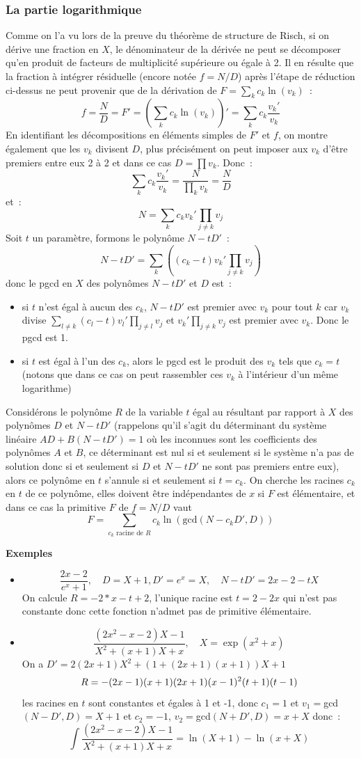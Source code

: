 \documentclass[a4paper,11pt]{article}
\begin{document}
\subsubsection{La partie logarithmique}
Comme on l'a vu lors de la preuve du théorème de structure de Risch,
si on dérive une fraction en $X$, le dénominateur de la dérivée ne
peut se décomposer qu'en produit de facteurs de multiplicité supérieure
ou égale à 2. Il en résulte que la fraction à intégrer résiduelle (encore
notée $f=N/D$) après l'étape de réduction ci-dessus ne peut provenir que de la
dérivation de $F=\sum_k c_k \ln (v_k)$~:
\[ f=\frac{N}{D}=F'= (\sum_k c_k \ln (v_k))'= \sum_k c_k \frac{v_k'}{v_k}\]
En identifiant les décompositions
en éléments simples de $F'$ et $f$, on montre également que 
les $v_k$ divisent $D$, plus précisément on peut imposer aux $v_k$
d'être premiers entre eux 2 à 2 et dans ce cas $D=\prod v_k$. 
Donc~:
\[ \sum_k c_k \frac{v_k'}{v_k} = \frac{N}{\prod_k v_k}=\frac{N}{D}\]
et~:
\[ N = \sum_k c_k v_k' \prod_{j\neq k} v_j \]
Soit $t$ un paramètre, formons le polynôme $N-tD'$~:
\[ N-tD' = \sum_k \left( (c_k -t) v_k' \prod_{j\neq k} v_j \right) \]
donc le pgcd en $X$ des polynômes $N-tD'$ et $D$ est~:
\begin{itemize}
\item si $t$ n'est égal à aucun des $c_k$, $N-tD'$ est premier
avec $v_k$ pour tout $k$ car $v_k$ divise
$\sum_{l \neq k} (c_l -t) v_l' \prod_{j\neq l} v_j$
et $v_k'\prod_{j\neq k} v_j $ est premier avec $v_k$. Donc
le pgcd est 1.
\item si $t$ est égal à l'un des $c_k$, alors le pgcd est le produit
des $v_k$ tels que $c_k=t$ (notons que dans ce cas on peut
rassembler ces $v_k$ à l'intérieur d'un même logarithme)
\end{itemize}
Considérons le polynôme $R$ de la variable $t$ égal au résultant par rapport
à $X$ des polynômes $D$ et $N-tD'$ (rappelons qu'il s'agit du
d\'eterminant du syst\`eme lin\'eaire $AD+B(N-tD')=1$
o\`u les inconnues sont les coefficients des polyn\^omes $A$ et $B$, 
ce d\'eterminant est nul si et seulement si le syst\`eme n'a pas
de solution donc si et seulement si $D$ et $N-tD'$ ne sont pas
premiers entre eux), alors ce polynôme en $t$
s'annule si et seulement si $t=c_k$. 
On cherche les racines $c_k$ en $t$ de ce polynôme,
elles doivent être indépendantes de $x$ si $F$ est élémentaire,
et dans ce cas la primitive $F$ de $f=N/D$ vaut
\[ F=\sum_{c_k \mbox{ racine de } R} c_k \ln(\mbox{gcd}(N-c_k D',D)) \]

{\bf Exemples}
\begin{itemize}
\item
\[ \frac{2x-2}{e^x+1}, \quad D=X+1, D'=e^x=X, \quad N-tD'=2x-2-tX \]
On calcule $R=-2*x-t+2$, l'unique racine est $t=2-2x$ qui n'est
pas constante donc cette fonction n'admet pas de primitive élémentaire.
\item 
\[ \frac{(2x^2-x-2)X-1}{X^2+(x+1)X+x}, \quad X=\exp(x^2+x)\]
On a $D'=2(2x+1)X^2+(1+(2x+1)(x+1))X+1$
\[ R=-(2\*x-1)\*(x+1)\*(2\*x+1)\*(x-1)^2\*(t+1)\*(t-1) \]
les racines en $t$ sont constantes et égales à 1 et -1, donc $c_1=1$
et $v_1=$gcd$(N-D',D)=X+1$ et $c_2=-1$, $v_2=$gcd$(N+D',D)=x+X$
donc~:
\[ \int \frac{(2x^2-x-2)X-1}{X^2+(x+1)X+x} = \ln(X+1)-\ln(x+X)\]
\end{itemize}
\end{document}
